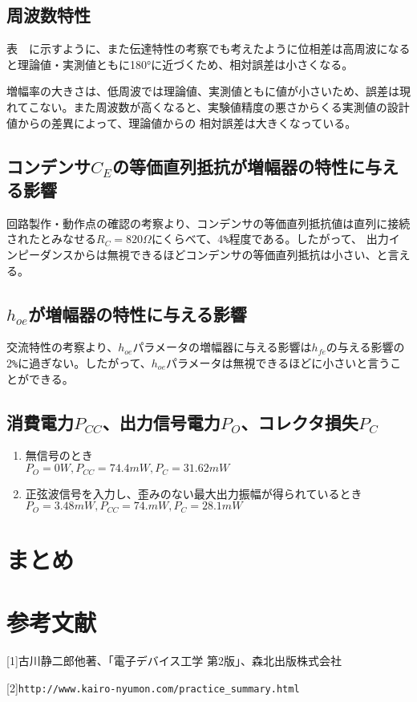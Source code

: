 \documentclass[11pt,a4j,titlepage]{jsarticle}
\begin{document}
 \subsection{周波数特性}
 表\ \ に示すように、また伝達特性の考察でも考えたように位相差は高周波になると理論値・実測値ともに180°に近づくため、相対誤差は小さくなる。
 
 増幅率の大きさは、低周波では理論値、実測値ともに値が小さいため、誤差は現れてこない。また周波数が高くなると、実験値精度の悪さからくる実測値の設計値からの差異によって、理論値からの
 相対誤差は大きくなっている。
 
 \subsection{コンデンサ$C_E$の等価直列抵抗が増幅器の特性に与える影響}
 回路製作・動作点の確認の考察より、コンデンサの等価直列抵抗値は直列に接続されたとみなせる$R_C=820\Omega$にくらべて、4\verb|%|程度である。したがって、
 出力インピーダンスからは無視できるほどコンデンサの等価直列抵抗は小さい、と言える。
 
 \subsection{$h_{oe}$が増幅器の特性に与える影響}
 交流特性の考察より、$h_{oe}$パラメータの増幅器に与える影響は$h_{fe}$の与える影響の2\verb|%|に過ぎない。したがって、$h_{oe}$パラメータは無視できるほどに小さいと言うことができる。
 
 \subsection{消費電力$P_{CC}$、出力信号電力$P_O$、コレクタ損失$P_C$}
 
  \begin{enumerate}
   \item 無信号のとき \\
   $P_O = 0W, P_{CC} = 74.4mW, P_C = 31.62 mW$ \\
   \item 正弦波信号を入力し、歪みのない最大出力振幅が得られているとき \\
   $P_O = 3.48mW, P_{CC} = 74.mW, P_C = 28.1mW$ \\
  \end{enumerate}

  
  
 \section{まとめ}
 
  \clearpage
  
  
 \section{参考文献}
 [1]古川静二郎他著、「電子デバイス工学 第2版」、森北出版株式会社
 
 [2]\verb|http://www.kairo-nyumon.com/practice_summary.html|
  
  
\end{document}
